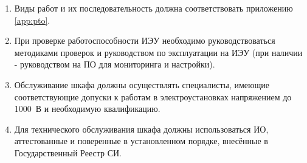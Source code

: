 \begin{enumerate}[label=\arabic{section}.\arabic{subsection}.\arabic*, align=left, labelsep=4pt, leftmargin=0pt, itemindent=2cm]

\item
Виды работ и их последовательность должна соответствовать приложению \ref{app:pto}.

\item
При проверке работоспособности ИЭУ необходимо руководствоваться методиками проверок и руководством по эксплуатации на ИЭУ (при наличии - руководством на ПО для мониторинга и настройки).

\item
Обслуживание шкафа должны осуществлять специалисты, имеющие соответствующие допуски к работам в электроустановках напряжением до 1000~В и необходимую квалификацию.

\item
Для технического обслуживания шкафа должны использоваться ИО, аттестованные и поверенные в установленном порядке, внесённые в Государственный Реестр СИ.

\end{enumerate}